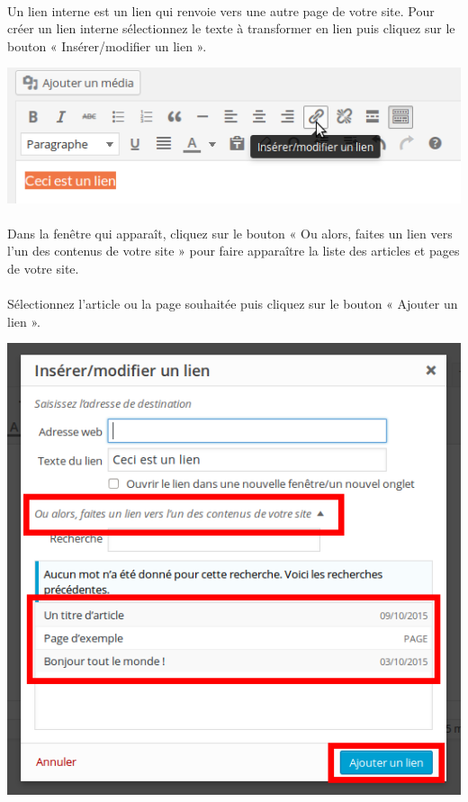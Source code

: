 \documentclass[10pt,a4paper]{article}
\begin{document}
\paragraph{}Un lien interne est un lien qui renvoie vers une autre page de votre site. Pour créer un lien interne sélectionnez le texte à transformer en lien puis cliquez sur le bouton « Insérer/modifier un lien ».
\begin{center}
\includegraphics[scale=0.35]{img/0077.png}
\end{center}
\paragraph{}Dans la fenêtre qui apparaît, cliquez sur le bouton « Ou alors, faites un lien vers l'un des contenus de votre site » pour faire apparaître la liste des articles et pages de votre site.
\paragraph{}Sélectionnez l'article ou la page souhaitée puis cliquez sur le bouton « Ajouter un lien ».
\begin{center}
\includegraphics[scale=0.35]{img/0078.png}
\end{center}
\end{document}
